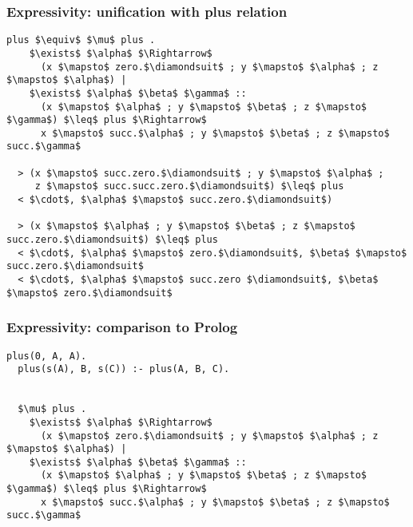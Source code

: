 \documentclass{beamer}
\begin{document}
\begin{frame}[fragile]
  \frametitle{Expressivity: unification with plus relation}

  \begin{lstlisting}[]
  plus $\equiv$ $\mu$ plus .
    $\exists$ $\alpha$ $\Rightarrow$ 
      (x $\mapsto$ zero.$\diamondsuit$ ; y $\mapsto$ $\alpha$ ; z $\mapsto$ $\alpha$) |
    $\exists$ $\alpha$ $\beta$ $\gamma$ :: 
      (x $\mapsto$ $\alpha$ ; y $\mapsto$ $\beta$ ; z $\mapsto$ $\gamma$) $\leq$ plus $\Rightarrow$ 
      x $\mapsto$ succ.$\alpha$ ; y $\mapsto$ $\beta$ ; z $\mapsto$ succ.$\gamma$

  > (x $\mapsto$ succ.zero.$\diamondsuit$ ; y $\mapsto$ $\alpha$ ; 
     z $\mapsto$ succ.succ.zero.$\diamondsuit$) $\leq$ plus
  < $\cdot$, $\alpha$ $\mapsto$ succ.zero.$\diamondsuit$)

  > (x $\mapsto$ $\alpha$ ; y $\mapsto$ $\beta$ ; z $\mapsto$ succ.zero.$\diamondsuit$) $\leq$ plus
  < $\cdot$, $\alpha$ $\mapsto$ zero.$\diamondsuit$, $\beta$ $\mapsto$ succ.zero.$\diamondsuit$
  < $\cdot$, $\alpha$ $\mapsto$ succ.zero $\diamondsuit$, $\beta$ $\mapsto$ zero.$\diamondsuit$
  \end{lstlisting}


\end{frame}
\begin{frame}[fragile]
  \frametitle{Expressivity: comparison to Prolog}

  \begin{lstlisting}[]
  plus(0, A, A).
  plus(s(A), B, s(C)) :- plus(A, B, C).


  $\mu$ plus .
    $\exists$ $\alpha$ $\Rightarrow$ 
      (x $\mapsto$ zero.$\diamondsuit$ ; y $\mapsto$ $\alpha$ ; z $\mapsto$ $\alpha$) |
    $\exists$ $\alpha$ $\beta$ $\gamma$ :: 
      (x $\mapsto$ $\alpha$ ; y $\mapsto$ $\beta$ ; z $\mapsto$ $\gamma$) $\leq$ plus $\Rightarrow$ 
      x $\mapsto$ succ.$\alpha$ ; y $\mapsto$ $\beta$ ; z $\mapsto$ succ.$\gamma$

  \end{lstlisting}

\end{frame}
\end{document}
